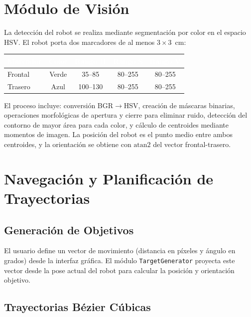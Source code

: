 \documentclass[11pt,a4paper]{article}
\begin{document}
\section{Módulo de Visión}

La detección del robot se realiza mediante segmentación por color en el espacio HSV. El robot porta dos marcadores de al menos $3 \times 3$~cm:

\begin{table}[h!]
\centering
{}
\begin{tabular}{lcccc}
    \toprule
    \rowcolor{azultabla}\textcolor{white}{\textbf{Marcador}} & \textcolor{white}{\textbf{Color}} & \textcolor{white}{\textbf{Rango H}} & \textcolor{white}{\textbf{Rango S}} & \textcolor{white}{\textbf{Rango V}} \\
    \midrule
    Frontal & Verde & 35--85   & 80--255 & 80--255 \\
    Trasero & Azul  & 100--130 & 80--255 & 80--255 \\
    \bottomrule
\end{tabular}
\end{table}

El proceso incluye: conversión BGR$\rightarrow$HSV, creación de máscaras binarias, operaciones morfológicas de apertura y cierre para eliminar ruido, detección del contorno de mayor área para cada color, y cálculo de centroides mediante momentos de imagen. La posición del robot es el punto medio entre ambos centroides, y la orientación se obtiene con $\text{atan2}$ del vector frontal-trasero.

\section{Navegación y Planificación de Trayectorias}

\subsection{Generación de Objetivos}

El usuario define un vector de movimiento (distancia en píxeles y ángulo en grados) desde la interfaz gráfica. El módulo \texttt{TargetGenerator} proyecta este vector desde la pose actual del robot para calcular la posición y orientación objetivo.

\subsection{Trayectorias Bézier Cúbicas}
\end{document}
